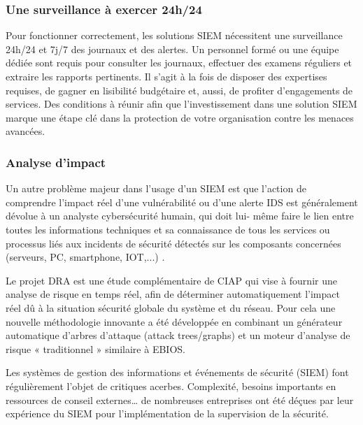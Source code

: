 \subsubsection{Une surveillance à exercer 24h/24}

Pour fonctionner correctement, les solutions SIEM nécessitent une surveillance 24h/24 et 7j/7 des journaux et des alertes. Un personnel formé ou une équipe dédiée sont requis pour consulter les journaux, effectuer des examens réguliers et extraire les rapports pertinents.  
 Il s’agit à la fois de disposer des expertises requises, de gagner en lisibilité budgétaire et, aussi, de profiter d’engagements de services. Des conditions à réunir afin que l’investissement dans une solution SIEM marque une étape clé dans la protection de votre organisation contre les menaces avancées.

\subsubsection{Analyse d'impact}


Un autre problème majeur dans l'usage d'un SIEM est que l'action de comprendre l’impact réel d’une vulnérabilité ou d’une alerte IDS est généralement dévolue à un analyste cybersécurité humain, qui doit lui- même faire le lien entre toutes les informations techniques et sa connaissance de tous les services ou processus liés aux incidents de sécurité détectés sur les composants concernées (serveurs, PC, smartphone, IOT,...) . 

Le projet DRA est une étude complémentaire de CIAP qui vise à fournir une analyse de risque en temps réel, afin de déterminer automatiquement l’impact réel dû à la situation sécurité globale du système et du réseau. Pour cela une nouvelle méthodologie innovante a été développée en combinant un générateur automatique d’arbres d’attaque (attack trees/graphs) et un moteur d’analyse de risque « traditionnel » similaire à EBIOS.

Les systèmes de gestion des informations et événements de sécurité (SIEM) font régulièrement l’objet de critiques acerbes. Complexité, besoins importants en ressources de conseil externes… de nombreuses entreprises ont été déçues par leur expérience du SIEM pour l’implémentation de la supervision de la sécurité.

